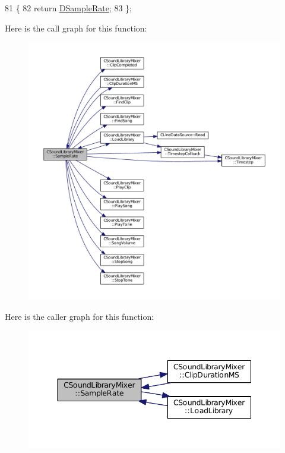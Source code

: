 \begin{DoxyCode}
81                               \{
82             \textcolor{keywordflow}{return} \hyperlink{classCSoundLibraryMixer_af2d94eb0c2b55d92ff00d18a25cbed6a}{DSampleRate};  
83         \};
\end{DoxyCode}
Here is the call graph for this function\+:\nopagebreak
\begin{figure}[H]
\begin{center}
\leavevmode
\includegraphics[width=350pt]{classCSoundLibraryMixer_a03221f151dfe72381da5d0d0539bab94_cgraph}
\end{center}
\end{figure}
Here is the caller graph for this function\+:\nopagebreak
\begin{figure}[H]
\begin{center}
\leavevmode
\includegraphics[width=344pt]{classCSoundLibraryMixer_a03221f151dfe72381da5d0d0539bab94_icgraph}
\end{center}
\end{figure}
\hypertarget{classCSoundLibraryMixer_ad38d70e5783e3b67fdf022877549ccf8}{}\label{classCSoundLibraryMixer_ad38d70e5783e3b67fdf022877549ccf8} 

